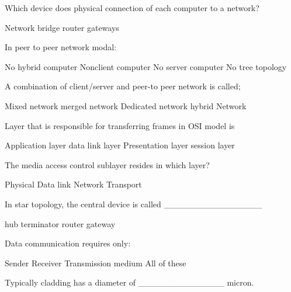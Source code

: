 \documentclass{exam}
\begin{document}
\begin{questions}
Which device does physical connection of each computer to a network?\\
\begin{oneparchoices}
\choice Network
\choice bridge
\choice router
\choice gateways
\end{oneparchoices}
\question 

In peer to peer network modal:\\
\begin{oneparchoices}
\choice No hybrid computer
\choice Nonclient computer
\choice No server computer
\choice No tree topology
\end{oneparchoices}
\question 

A combination of client/server and peer-to peer network is called;\\
\begin{oneparchoices}
\choice Mixed network
\choice merged network
\choice Dedicated network
\choice hybrid Network
\end{oneparchoices}
\question 

Layer that is responsible for transferring frames in OSI model is\\
\begin{oneparchoices}
\choice Application layer
\choice data link layer
\choice Presentation layer
\choice session layer
\end{oneparchoices}
\question 

The media access control sublayer resides in which layer?\\
\begin{oneparchoices}
\choice Physical
\choice Data link
\choice Network
\choice Transport
\end{oneparchoices}
\question 

In star topology, the central device is called \_\_\_\_\_\_\_\_\_\_\_\_\_\_\_\_\\
\begin{oneparchoices}
\choice hub
\choice terminator
\choice router
\choice gateway
\end{oneparchoices}
\question 

Data communication requires only:\\
\begin{oneparchoices}
\choice Sender
\choice Receiver
\choice Transmission medium
\choice All of these
\end{oneparchoices}
\question 

Typically cladding has a diameter of \_\_\_\_\_\_\_\_\_\_\_\_\_\_ micron.\\
\begin{oneparchoices}
\end{oneparchoices}
\question 


\end{questions}
\end{document}
